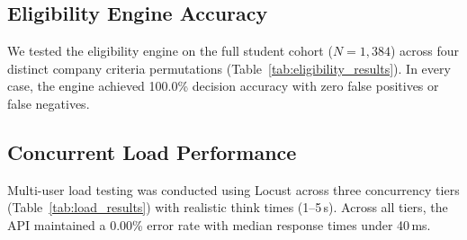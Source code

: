 \documentclass[conference]{IEEEtran}
\begin{document}
\subsection{Eligibility Engine Accuracy}
We tested the eligibility engine on the full student cohort ($N = 1,384$) across four distinct company criteria permutations (Table~\ref{tab:eligibility_results}). In every case, the engine achieved 100.0\% decision accuracy with zero false positives or false negatives.

\begin{table}[ht]
\caption{Eligibility Engine Validation Across 1,384 Student Profiles}
\label{tab:eligibility_results}
\centering
{}
\end{table}

\subsection{Concurrent Load Performance}
Multi-user load testing was conducted using Locust across three concurrency tiers (Table~\ref{tab:load_results}) with realistic think times (1--5\,s). Across all tiers, the API maintained a 0.00\% error rate with median response times under 40\,ms.

\begin{table}[ht]
\caption{Locust Concurrent Load Test Results}
\label{tab:load_results}
\centering
{}
\end{table}
\end{document}
